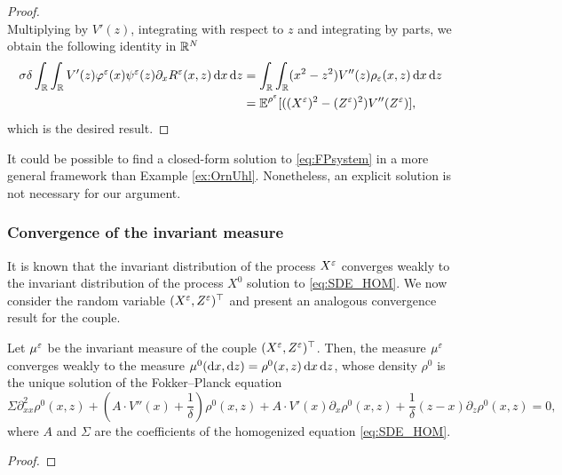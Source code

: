 \documentclass[10pt]{article}
\begin{document}
\begin{proof}
\begin{equation}
\end{equation}
Multiplying by $V'(z)$, integrating with respect to $z$ and integrating by parts, we obtain the following identity in $\mathbb{R}^N$
\begin{equation}
\begin{aligned}
\sigma \delta \int_{\mathbb{R}} \int_{\mathbb{R}} V'(z) \varphi^\varepsilon(x) \psi^\varepsilon(z) \partial_x R^\varepsilon(x,z) \,\mathrm{d} x \,\mathrm{d} z &=  \int_{\mathbb{R}} \int_{\mathbb{R}} (x^2 - z^2) V''(z) \rho_\varepsilon(x,z) \,\mathrm{d} x \,\mathrm{d} z \\
&= \operatorname{\mathbb{E}}^{\rho^\varepsilon}[((X^\varepsilon)^2 - (Z^\varepsilon)^2)V''(Z^\varepsilon)],
\end{aligned}
\end{equation}
which is the desired result.
\end{proof}

\begin{remark} It could be possible to find a closed-form solution to \eqref{eq:FPsystem} in a more general framework than Example \ref{ex:OrnUhl}. Nonetheless, an explicit solution is not necessary for our argument.
\end{remark}

\subsubsection{Convergence of the invariant measure}\label{sec:convMeasure}

It is known that the invariant distribution of the process $X^\varepsilon$ converges weakly to the invariant distribution of the process $X^0$ solution to \eqref{eq:SDE_HOM}. We now consider the random variable $(X^\varepsilon, Z^\varepsilon)^\top$ and present an analogous convergence result for the couple.

\begin{lemma}\label{lem:convMeasure} Let $\mu^\varepsilon$ be the invariant measure of the couple $(X^\varepsilon, Z^\varepsilon)^\top$. Then, the measure $\mu^\varepsilon$ converges weakly to the measure $\mu^0(\mathrm{d} x, \mathrm{d} z) = \rho^0(x, z) \,\mathrm{d} x \,\mathrm{d} z$, whose density $\rho^0$ is the unique solution of the Fokker--Planck equation
\begin{equation} \label{eq:FPsystem_homogenized}
	\Sigma \partial^2_{xx} \rho^0(x,z) + \left ( A \cdot V''(x) + \frac{1}{\delta} \right ) \rho^0(x,z) + A \cdot V'(x) \partial_x \rho^0(x,z) + \frac{1}{\delta}(z - x) \partial_z \rho^0(x,z) = 0,
\end{equation}
where $A$ and $\Sigma$ are the coefficients of the homogenized equation \eqref{eq:SDE_HOM}.
\end{lemma}
\begin{proof} \todo
\end{proof}
\end{document}
